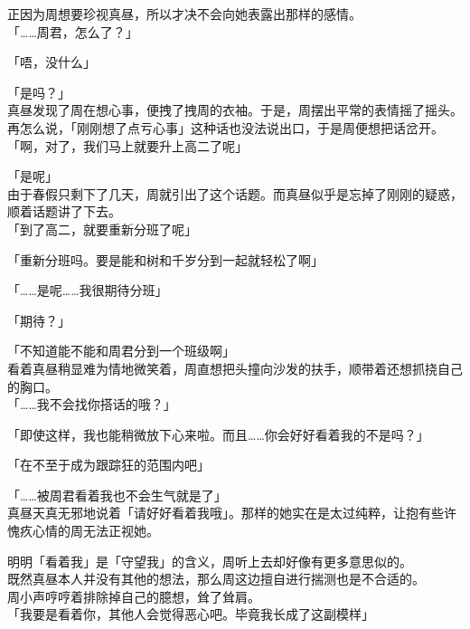 正因为周想要珍视真昼，所以才决不会向她表露出那样的感情。\\

「……周君，怎么了？」

「唔，没什么」

「是吗？」\\

真昼发现了周在想心事，便拽了拽周的衣袖。于是，周摆出平常的表情摇了摇头。\\

再怎么说，「刚刚想了点亏心事」这种话也没法说出口，于是周便想把话岔开。\\

「啊，对了，我们马上就要升上高二了呢」

「是呢」\\

由于春假只剩下了几天，周就引出了这个话题。而真昼似乎是忘掉了刚刚的疑惑，顺着话题讲了下去。\\

「到了高二，就要重新分班了呢」

「重新分班吗。要是能和树和千岁分到一起就轻松了啊」

「……是呢……我很期待分班」

「期待？」

「不知道能不能和周君分到一个班级啊」\\

看着真昼稍显难为情地微笑着，周直想把头撞向沙发的扶手，顺带着还想抓挠自己的胸口。\\

「……我不会找你搭话的哦？」

「即使这样，我也能稍微放下心来啦。而且……你会好好看着我的不是吗？」

「在不至于成为跟踪狂的范围内吧」

「……被周君看着我也不会生气就是了」\\

真昼天真无邪地说着「请好好看着我哦」。那样的她实在是太过纯粹，让抱有些许愧疚心情的周无法正视她。

明明「看着我」是「守望我」的含义，周听上去却好像有更多意思似的。\\

既然真昼本人并没有其他的想法，那么周这边擅自进行揣测也是不合适的。\\

周小声哼哼着排除掉自己的臆想，耸了耸肩。\\

「我要是看着你，其他人会觉得恶心吧。毕竟我长成了这副模样」\\

